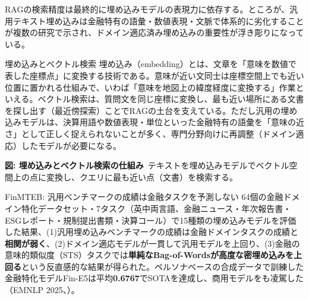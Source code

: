 RAGの検索精度は最終的に埋め込みモデルの表現力に依存する。ところが、汎用テキスト埋め込みは金融特有の語彙・数値表現・文脈で体系的に劣化することが複数の研究で示され、ドメイン適応済み埋め込みの重要性が浮き彫りになっている。

\begin{concept}{埋め込みとベクトル検索}
埋め込み（embedding）とは、文章を「意味を数値で表した座標点」に変換する技術である。意味が近い文同士は座標空間上でも近い位置に置かれる仕組みで、いわば「意味を地図上の緯度経度に変換する」作業といえる。ベクトル検索は、質問文を同じ座標に変換し、最も近い場所にある文書を探し出す（最近傍探索）ことでRAGの土台を支えている。ただし汎用の埋め込みモデルは、決算用語や数値表現・単位といった金融特有の語彙を「意味の近さ」として正しく捉えられないことが多く、専門分野向けに再調整（ドメイン適応）したモデルが必要になる。
\begin{center}
\end{center}
{\small\color{brandgray}\textbf{図: 埋め込みとベクトル検索の仕組み}\ テキストを埋め込みモデルでベクトル空間上の点に変換し、クエリに最も近い点（文書）を検索する。}
\end{concept}

\begin{casestudy}{FinMTEB: 汎用ベンチマークの成績は金融タスクを予測しない}
64個の金融ドメイン特化データセット・7タスク（英中両言語、金融ニュース・年次報告書・ESGレポート・規制提出書類・決算コール）で15種類の埋め込みモデルを評価した結果、(1)汎用埋め込みベンチマークの成績は金融ドメインタスクの成績と\textbf{相関が弱く}、(2)ドメイン適応モデルが一貫して汎用モデルを上回り、(3)金融の意味的類似度（STS）タスクでは\textbf{単純なBag-of-Wordsが高度な密埋め込みを上回る}という反直感的な結果が得られた。ペルソナベースの合成データで訓練した金融特化モデルFin-E5は平均\textbf{0.6767}でSOTAを達成し、商用モデルをも凌駕した（EMNLP 2025、\cite{x02finmteb2025}）。
\end{casestudy}

